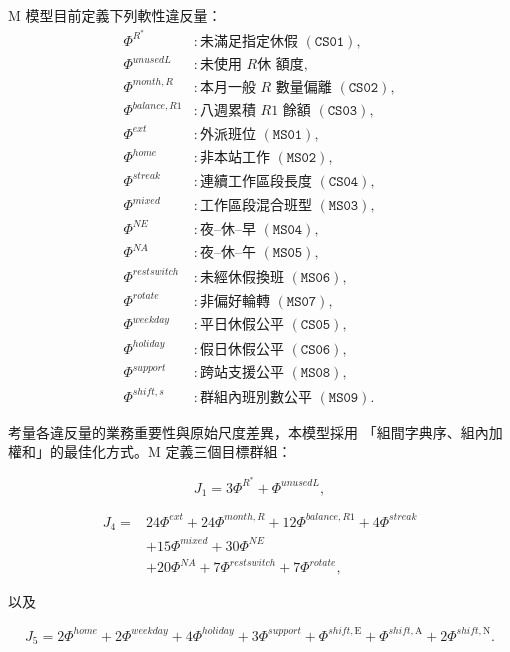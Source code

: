 \documentclass[12pt]{article}
\begin{document}
M 模型目前定義下列軟性違反量：
\[
  \begin{aligned}
    \Phi^{R^*}        &:\text{未滿足指定休假 }(\texttt{CS01}),\\
    \Phi^{unusedL}    &:\text{未使用 }R休\text{ 額度},\\
    \Phi^{month,R}    &:\text{本月一般 }R\text{ 數量偏離 }(\texttt{CS02}),\\
    \Phi^{balance,R1} &:\text{八週累積 }R1\text{ 餘額 }(\texttt{CS03}),\\
    \Phi^{ext}        &:\text{外派班位 }(\texttt{MS01}),\\
    \Phi^{home}       &:\text{非本站工作 }(\texttt{MS02}),\\
    \Phi^{streak}     &:\text{連續工作區段長度 }(\texttt{CS04}),\\
    \Phi^{mixed}      &:\text{工作區段混合班型 }(\texttt{MS03}),\\
    \Phi^{NE}         &:\text{夜--休--早 }(\texttt{MS04}),\\
    \Phi^{NA}         &:\text{夜--休--午 }(\texttt{MS05}),\\
    \Phi^{restswitch} &:\text{未經休假換班 }(\texttt{MS06}),\\
    \Phi^{rotate}     &:\text{非偏好輪轉 }(\texttt{MS07}),\\
    \Phi^{weekday}    &:\text{平日休假公平 }(\texttt{CS05}),\\
    \Phi^{holiday}    &:\text{假日休假公平 }(\texttt{CS06}),\\
    \Phi^{support}    &:\text{跨站支援公平 }(\texttt{MS08}),\\
    \Phi^{shift,s}    &:\text{群組內班別數公平 }(\texttt{MS09}).
  \end{aligned}
\]

考量各違反量的業務重要性與原始尺度差異，本模型採用
「組間字典序、組內加權和」的最佳化方式。M 定義三個目標群組：

\[
  J_1=3\Phi^{R^*}+\Phi^{unusedL},
\]

\[
  \begin{aligned}
    J_4={}&
    24\Phi^{ext}
    +24\Phi^{month,R}
    +12\Phi^{balance,R1}
    +4\Phi^{streak}\\
    &+15\Phi^{mixed}
    +30\Phi^{NE}\\
    &+20\Phi^{NA}
    +7\Phi^{restswitch}
    +7\Phi^{rotate},
  \end{aligned}
\]

以及

\[
  J_5
  =
  2\Phi^{home}
  +2\Phi^{weekday}
  +4\Phi^{holiday}
  +3\Phi^{support}
  +\Phi^{shift,\mathrm E}
  +\Phi^{shift,\mathrm A}
  +2\Phi^{shift,\mathrm N}.
\]
\end{document}
